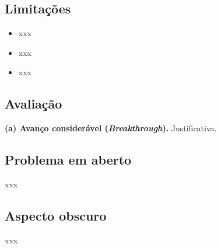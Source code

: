 \subsection{Limitações} %
\begin{itemize}
  \item xxx
  \item xxx
  \item xxx
\end{itemize} 


\subsection{Avaliação}
\textbf{(a) Avanço considerável (\textit{Breakthrough}).}
Justificativa.

\subsection{Problema em aberto}
xxx

\subsection{Aspecto obscuro}
xxx